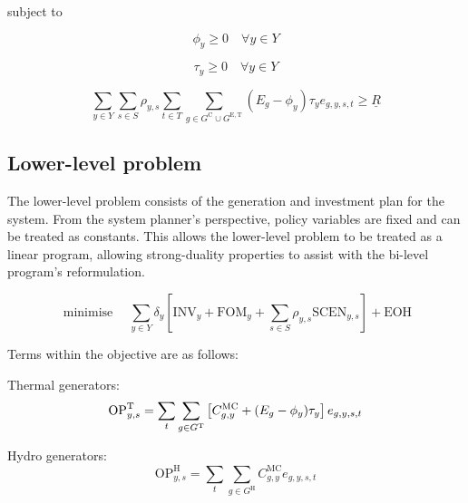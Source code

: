 \documentclass{article}
\newcommand{\sGeneratorsExistingThermal}{G^{\mathrm{E,T}}}
\newcommand{\sGeneratorsCandidate}{G^{\mathrm{C}}}
\newcommand{\sGeneratorsThermal}{G^{\mathrm{T}}}
\newcommand{\sGeneratorsHydro}{G^{\mathrm{H}}}
\newcommand{\sYears}{Y}
\newcommand{\sScenarios}{S}
\newcommand{\sIntervals}{T}
\newcommand{\iGenerator}{g}
\newcommand{\iYear}{y}
\newcommand{\iScenario}{s}
\newcommand{\iInterval}{t}
\newcommand{\cOperatingCostThermal}[1][\iYear,\iScenario]{\mathrm{OP}^{\mathrm{T}}_{#1}}
\newcommand{\cOperatingCostHydro}[1][\iYear,\iScenario]{\mathrm{OP}^{\mathrm{H}}_{#1}}
\newcommand{\cFixedOperationsMaintenanceCost}[1][\iYear]{\mathrm{FOM}_{#1}}
\newcommand{\cScenarioDuration}[1][\iYear,\iScenario]{\rho_{#1}}
\newcommand{\cMarginalCost}[1][\iGenerator,\iYear]{C^{\mathrm{MC}}_{#1}}
\newcommand{\cEmissionsIntensity}[1][\iGenerator]{E_{#1}}
\newcommand{\cInvestmentCost}[1][\iYear]{\mathrm{INV}_{#1}}
\newcommand{\cOperatingCostScenario}[1][\iYear,\iScenario]{\mathrm{SCEN}_{#1}}
\newcommand{\cDiscountRate}[1][\iYear]{\delta_{#1}}
\newcommand{\vBaseline}[1][\iYear]{\phi_{#1}}
\newcommand{\vPermitPrice}[1][\iYear]{\tau_{#1}}
\newcommand{\vEnergy}[1][\iGenerator,\iYear,\iScenario,\iInterval]{e_{#1}}
\newcommand{\cMinimumSchemeRevenue}{\underline{R}}
\newcommand{\cEndOfHorizonCost}{\textrm{EOH}}
\DeclareMathOperator*{\minimise}{minimise}
\begin{document}
subject to

\begin{equation}
	\vBaseline \geq 0 \quad \forall \iYear \in \sYears
\end{equation}

\begin{equation}
	\vPermitPrice \geq 0 \quad \forall \iYear \in \sYears
\end{equation}

\begin{equation}
	\sum\limits_{\iYear \in \sYears} \sum\limits_{\iScenario \in \sScenarios} \cScenarioDuration \sum\limits_{\iInterval \in \sIntervals} \sum\limits_{\iGenerator \in \sGeneratorsCandidate \cup \sGeneratorsExistingThermal}\left(\cEmissionsIntensity -\vBaseline\right)\vPermitPrice \vEnergy \geq \cMinimumSchemeRevenue
\end{equation}

\subsection{Lower-level problem}
The lower-level problem consists of the generation and investment plan for the system. From the system planner's perspective, policy variables are fixed and can be treated as constants. This allows the lower-level problem to be treated as a linear program, allowing strong-duality properties to assist with the bi-level program's reformulation.

\begin{equation}
	\minimise \quad \sum\limits_{\iYear\in\sYears} \cDiscountRate \left[\cInvestmentCost + \cFixedOperationsMaintenanceCost + \sum\limits_{\iScenario \in \sScenarios} \cScenarioDuration \cOperatingCostScenario \right] + \cEndOfHorizonCost
\end{equation}

Terms within the objective are as follows:

Thermal generators:
\begin{equation}
	\cOperatingCostThermal = \sum\limits_{\iInterval} \sum\limits_{\iGenerator \in \sGeneratorsThermal} \left[\cMarginalCost + (\cEmissionsIntensity - \vBaseline)\vPermitPrice\right]\vEnergy\\
\end{equation}

Hydro generators:
\begin{equation}
	\cOperatingCostHydro = \sum\limits_{\iInterval}\sum\limits_{\iGenerator \in \sGeneratorsHydro}\cMarginalCost \vEnergy
\end{equation}
\end{document}
